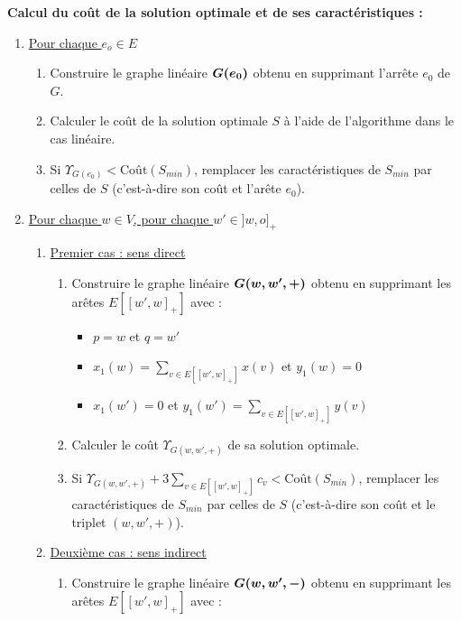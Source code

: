 \textbf{Calcul du coût de la solution optimale et de ses caractéristiques :}
\begin{enumerate}
\item\label{Ze0 nul} \uline{Pour chaque $e_o \in E$}
  \begin{enumerate}
  \item Construire le graphe linéaire $\boldsymbol{G(e_0)}$ obtenu en supprimant l'arrête $e_0$ de $G$.
  \item Calculer le coût de la solution optimale $S$ à l'aide de l'algorithme dans le cas linéaire.
  \item Si $\Upsilon_{G(e_0)} < \mbox{Coût}(S_{min})$, remplacer les caractéristiques de $S_{min}$ par celles de $S$ (c'est-à-dire son coût et l'arête $e_0$).
  \end{enumerate}
\item\label{Ze0 unitaire} \uline{Pour chaque $w \in V$, pour chaque $w' \in ]w,o]_+$}
  \begin{enumerate}
  \item \uline{Premier cas : sens direct}
    \begin{enumerate}
    \item\label{Ze0 unitaire - direct} Construire le graphe linéaire $\boldsymbol{G(w,w',+)}$ obtenu en supprimant les arêtes $E\left[ \left[w',w\right]_+ \right]$ avec :
      \begin{itemize}
      \item $p=w$ et $q=w'$
      \item $x_1(w) = \sum_{v \in E\left[ \left[w',w\right]_+ \right]} x(v)$ et $y_1(w) = 0$
      \item $x_1(w') = 0$ et $y_1(w') = \sum_{v \in E\left[ \left[w',w\right]_+ \right]} y(v)$
      \end{itemize}
    \item Calculer le coût $\Upsilon_{G(w,w',+)}$ de sa solution optimale.
    \item Si $\Upsilon_{G(w,w',+)} + 3 \sum_{ v \in E\left[ \left[w',w\right]_+ \right] }c_v < \mbox{Coût}(S_{min})$, remplacer les caractéristiques de $S_{min}$ par celles de $S$ (c'est-à-dire son coût et le triplet $(w,w',+)$).
    \end{enumerate}
  \item\label{Ze0 unitaire - indirect} \uline{Deuxième cas : sens indirect}
    \begin{enumerate}
    \item Construire le graphe linéaire $\boldsymbol{G(w,w',-)}$ obtenu en supprimant les arêtes $E\left[ \left[w',w\right]_+ \right]$ avec :

\end{enumerate}
\end{enumerate}
\end{enumerate}
